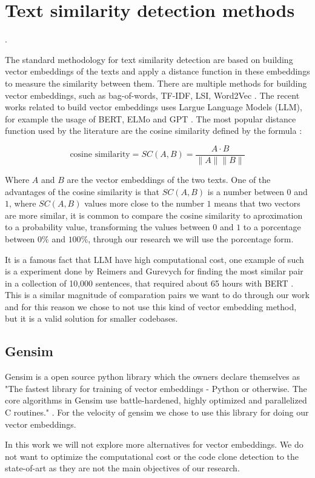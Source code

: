 \en

\section{Text similarity detection methods}
\label{sec:similarity}.

The standard methodology for text similarity detection are based on building vector embeddings of
the texts and apply a distance function in these embeddings to measure the similarity between them. 
There are multiple methods for building vector embeddings, such as bag-of-words, TF-IDF, LSI, Word2Vec \citep{gensimlivro}. 
The recent works related to build vector embeddings uses Largue Language Models (LLM), for example the usage of BERT, ELMo 
and GPT \citep{llmsimilar}. The most popular distance function used by the literature are the cosine similarity 
defined by the formula \citep{cosineref}:

$$\text{cosine similarity} = SC(A,B) = \frac{ A \cdot B}{ \lVert A \rVert \lVert B \rVert }$$

Where $A$ and $B$ are the vector embeddings of the two texts. One of the advantages of the cosine similarity is that $SC(A,B)$ 
is a number between $0$ and $1$, where $SC(A,B)$ values more close to the number $1$ means that two vectors are more similar,
it is common to compare the cosine similarity to aproximation to a probability value, transforming the values between $0$ and $1$ to a
porcentage between $0 \% $ and $100\%$, through our research we will use the porcentage form.

It is a famous fact that LLM have high computational cost, one example of such is a experiment done by Reimers and Gurevych for 
finding the most similar pair in a collection of 10,000 sentences, that required about 65 hours with BERT \citep{bertsimilar}. This 
is a similar magnitude of comparation pairs we want to do through our work and for this reason we chose to not use this kind of 
vector embedding method, but it is a valid solution for smaller codebases.

\subsection{Gensim}

Gensim is a open source python library \citep{gensim} which the owners declare themselves as "The fastest library 
for training of vector embeddings - Python or otherwise. The core algorithms in Gensim use battle-hardened, 
highly optimized and parallelized C routines." \citep{gensimsite}. For the velocity of gensim we chose to use this library
for doing our vector embeddings. 

In this work we will not explore more alternatives for vector embeddings. We do not want to optimize the computational 
cost or the code clone detection to the state-of-art as they are not the main objectives of our research.


